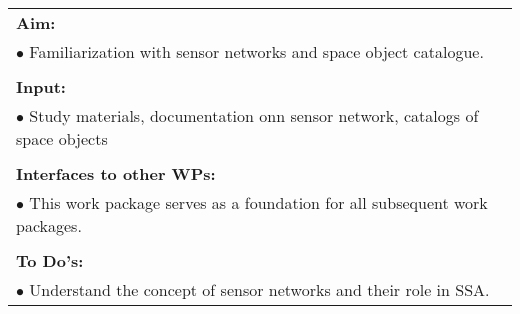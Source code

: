 \begin{table}[!h]
\begin{center}
\begin{tabular}{|p{35mm}||p{55mm}|p{50mm}||p{40mm}|}
      \hline\hline
      \multicolumn{4}{|p{150mm}|}{\textbf{Aim:}}                                                                                                                                                            \\
      \multicolumn{4}{|p{150mm}|}{$\bullet$ Familiarization with sensor networks and space object catalogue.}                                                   \\
      \multicolumn{4}{|p{150mm}|}{}                                                                                                                                                                           \\
      \multicolumn{4}{|p{150mm}|}{\textbf{Input:}}                                                                                                                                                            \\
      \multicolumn{4}{|p{150mm}|}{$\bullet$ Study materials, documentation onn sensor network, catalogs of space objects}                                                                                                                                 \\
      \multicolumn{4}{|p{150mm}|}{}                                                                                                                                                                           \\
      \multicolumn{4}{|p{150mm}|}{\textbf{Interfaces to other WPs:}}                                                                                                                                    \\
      \multicolumn{4}{|p{150mm}|}{$\bullet$ This work package serves as a foundation for all subsequent work packages.}                                                                                              \\
      \multicolumn{4}{|p{150mm}|}{}                                                                                                                                                                           \\
      \multicolumn{4}{|p{150mm}|}{\textbf{To Do's:}}                                                                                                                                                         \\
      \multicolumn{4}{|p{150mm}|}{$\bullet$ Understand the concept of sensor networks and their role in SSA.}\\

\end{tabular}
\end{center}
\end{table}
